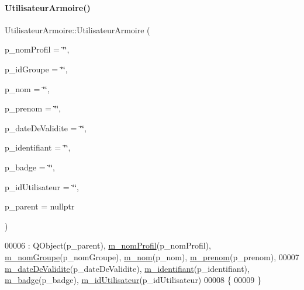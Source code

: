 \paragraph{\texorpdfstring{Utilisateur\+Armoire()}{UtilisateurArmoire()}}
{\footnotesize\ttfamily Utilisateur\+Armoire\+::\+Utilisateur\+Armoire (\begin{DoxyParamCaption}\item[{Q\+String}]{p\+\_\+nom\+Profil = {\ttfamily \char`\"{}\char`\"{}},  }\item[{Q\+String}]{p\+\_\+id\+Groupe = {\ttfamily \char`\"{}\char`\"{}},  }\item[{Q\+String}]{p\+\_\+nom = {\ttfamily \char`\"{}\char`\"{}},  }\item[{Q\+String}]{p\+\_\+prenom = {\ttfamily \char`\"{}\char`\"{}},  }\item[{Q\+String}]{p\+\_\+date\+De\+Validite = {\ttfamily \char`\"{}\char`\"{}},  }\item[{Q\+String}]{p\+\_\+identifiant = {\ttfamily \char`\"{}\char`\"{}},  }\item[{Q\+String}]{p\+\_\+badge = {\ttfamily \char`\"{}\char`\"{}},  }\item[{Q\+String}]{p\+\_\+id\+Utilisateur = {\ttfamily \char`\"{}\char`\"{}},  }\item[{Q\+Object $\ast$}]{p\+\_\+parent = {\ttfamily nullptr} }\end{DoxyParamCaption})\hspace{0.3cm}{\ttfamily [explicit]}}


\begin{DoxyCode}
00006     : QObject(p\_parent), \hyperlink{class_utilisateur_armoire_a470f47c105d9b3124c8d284b164a443d}{m\_nomProfil}(p\_nomProfil), \hyperlink{class_utilisateur_armoire_a6cf08d0dafdc9111d34f34a47c78b373}{m\_nomGroupe}(p\_nomGroupe), 
      \hyperlink{class_utilisateur_armoire_a39e1227fe3c7d726b161acab6a5c3434}{m\_nom}(p\_nom), \hyperlink{class_utilisateur_armoire_a652d7a57ec09963d16ab82838a5ffc51}{m\_prenom}(p\_prenom),
00007       \hyperlink{class_utilisateur_armoire_a51bd81c78d69ea2699373d820bae31e4}{m\_dateDeValidite}(p\_dateDeValidite), \hyperlink{class_utilisateur_armoire_a30cb02e16dd9085a70c6b436781bb756}{m\_identifiant}(p\_identifiant), 
      \hyperlink{class_utilisateur_armoire_a1a3170a83da04d9f49816a98b226baeb}{m\_badge}(p\_badge), \hyperlink{class_utilisateur_armoire_a7e3072a1a336d5ee1cf87c81d27b11e0}{m\_idUtilisateur}(p\_idUtilisateur)
00008 \{
00009 \}
\end{DoxyCode}


